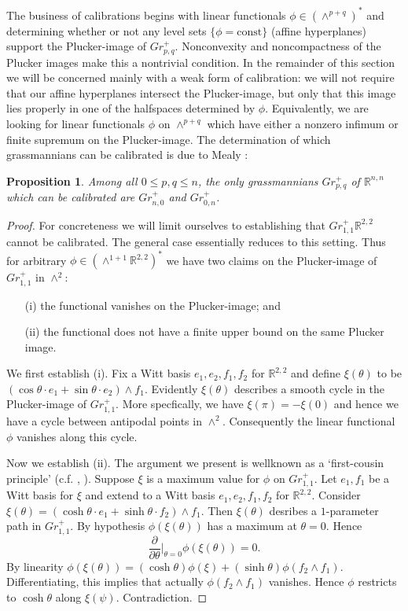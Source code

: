 \documentclass[12pt]{amsart}
\newtheorem{prop}[thm]{Proposition}
\theoremstyle{definition}
\theoremstyle{remark}
\newcommand{\bR}{\mathbb{R}}
\newcommand{\del}{\partial}
\begin{document}
The business of calibrations begins with linear functionals $\phi \in (\wedge^{p+q})^*$ and determining whether or not any level sets $\{\phi=\mathrm{const}\}$ (affine hyperplanes) support the Plucker-image of $Gr^+_{p,q}$. Nonconvexity and noncompactness of the Plucker images make this a nontrivial condition. In the remainder of this section we will be concerned mainly with a weak form of calibration: we will not require that our affine hyperplanes intersect the Plucker-image, but only that this image lies properly in one of the halfspaces determined by $\phi$. Equivalently, we are looking for linear functionals $\phi$ on $\wedge^{p+q}$ which have either a nonzero infimum or finite supremum on the Plucker-image. The determination of which grassmannians can be calibrated is due to Mealy \cite{M}: 

\begin{prop}\label{cal}
Among all $0 \leq p,q \leq n$, the only grassmannians $Gr_{p,q}^+$ of $\bR^{n,n}$ which can be calibrated are $Gr_{n,0}^+$ and $Gr_{0,n}^+$.
\end{prop} 
\begin{proof}
For concreteness we will limit ourselves to establishing that $Gr^+_{1,1} \bR^{2,2}$ cannot be calibrated. The general case essentially reduces to this setting. Thus for arbitrary $\phi \in (\wedge^{1+1} \bR^{2,2})^*$ we have two claims on the Plucker-image of $Gr^+_{1,1}$ in $\wedge^2$: 
\begin{enumerate}
\item[(i)] the functional vanishes on the Plucker-image; and 
\item[(ii)] the functional does not have a finite upper bound on the same Plucker image.  
\end{enumerate}


We first establish (i). Fix a Witt basis $e_1, e_2, f_1, f_2$ for $\bR^{2,2}$ and define $\xi(\theta)$  to be $(\cos \theta \cdot e_1 + \sin \theta \cdot e_2)\wedge f_1$. Evidently $\xi(\theta)$ describes a smooth cycle in the Plucker-image of $Gr^+_{1,1}$. More specfically, we have $\xi(\pi)=-\xi(0)$ and hence we have a cycle between antipodal points in $\wedge^2$. Consequently the linear functional $\phi$ vanishes along this cycle. 

Now we establish (ii). The argument we present is wellknown as a `first-cousin principle' (c.f. \cite{HL}, \cite{M}). Suppose $\xi$ is a maximum value for $\phi$ on $Gr^+_{1,1}$. Let $e_1, f_1$ be a Witt basis for $\xi$ and extend to a Witt basis $e_1, e_2, f_1, f_2$ for $\bR^{2,2}$. Consider $\xi(\theta)=(\cosh \theta \cdot e_1 + \sinh \theta \cdot f_2)\wedge f_1$. Then $\xi(\theta)$ desribes a $1$-parameter path in $Gr^+_{1,1}$. By hypothesis $\phi(\xi(\theta))$ has a maximum at $\theta=0$. Hence $$\frac{\del}{\del \theta}|_{\theta=0} \phi(\xi(\theta))=0.$$ By linearity $\phi(\xi(\theta))=(\cosh \theta)\phi(\xi) + (\sinh \theta) \phi(f_2\wedge f_1)$. Differentiating, this implies that actually $\phi(f_2 \wedge f_1)$ vanishes. Hence $\phi$ restricts to $\cosh \theta$ along $\xi(\psi)$. Contradiction.     
\end{proof}
\end{document}
